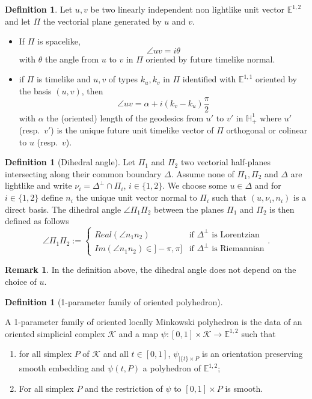 \documentclass[a4paper,12pt]{article}
\def\H{\mathbb{H}}
\def\E{\mathbf E}
\def\E{\mathbb{E}}
\newcommand{\mass}[1]{{\mathbb E}^{1,2}_{#1}}
\def\E{\mathbb{E}}
\theoremstyle{definition}
\newtheorem{defi}[lem]{Definition}	%
\newtheorem*{rem}{Remark}			 %
\begin{document}
					\begin{defi} Let $u,v$ be two linearly independent non lightlike unit vector $\mass{}$ and let $\Pi$ the vectorial plane generated by $u$
					and $v$.
					\begin{itemize}
					 \item If $\Pi$ is spacelike, $$\angle uv=i\theta$$ with $\theta$ the angle from $u$ to $v$ in $\Pi$ oriented by future timelike normal.
					 \item if $\Pi$ is timelike and $u,v$ of types $k_u,k_v$ in $\Pi$ identified with $\E^{1,1}$ oriented by the basis $(u,v)$, then
					 $$\angle uv=\alpha+i(k_v-k_u)\frac{\pi}{2}$$
					 with $\alpha$ the (oriented) length of the geodesics from $u'$ to $v'$ in $\H^1_+$ where $u'$ (resp.\ $v'$) is the unique future unit timelike vector of $\Pi$ orthogonal or colinear to $u$ (resp.\ $v$).
					\end{itemize}


					\end{defi}

					\begin{defi}[Dihedral angle]
					Let $\Pi_1$ and $\Pi_2$ two vectorial half-planes intersecting along their common boundary $\Delta$.
					Assume none of $\Pi_1,\Pi_2$ and $\Delta$ are lightlike and write $\nu_i=\Delta^\perp\cap\Pi_i$, $i\in \{1,2\}$.
					We choose some $u\in \Delta$ and for $i\in \{1,2\}$ define $n_i$ the unique unit vector normal to $\Pi_i$ such that $(u,\nu_i,n_i)$ is a direct basis.
					The  dihedral angle $\angle \Pi_1\Pi_2$ between the planes $\Pi_1$ and $\Pi_2$ is then defined as 
					 follows 
					$$\angle \Pi_1\Pi_2:= \left\{\begin{array}{ll}
					                               Real(\angle n_1n_2) & \text{if } \Delta^\perp \text{ is Lorentzian} \\ 
                                                 Im(\angle n_1n_2) \in ]-\pi,\pi] & \text{if } \Delta^\perp \text{ is Riemannian} 
					                             \end{array}
\right.. $$
                    
					\end{defi}
					\begin{rem}
					In the definition above, the dihedral angle does not depend on the choice of $u$. 
					\end{rem}


					\begin{defi}[1-parameter family of oriented polyhedron]\

						A 1-parameter family of oriented locally Minkowski polyhedron is the data of an oriented simplicial complex $\mathcal K$ and a map $\psi:[0,1]\times \mathcal K \rightarrow \mass{}$ such that
						\begin{enumerate}
						 \item for all simplex $P$ of $\mathcal K$ and all $t\in [0,1]$, $\psi_{|\{t\}\times P}$ is an orientation preserving smooth embedding
						 and $\psi(t,P)$ a polyhedron of $\mass{}$;
						 \item For all simplex $P$ and the restriction of $\psi$ to $[0,1]\times P$ is smooth.
						\end{enumerate}
					\end{defi}
\end{document}
